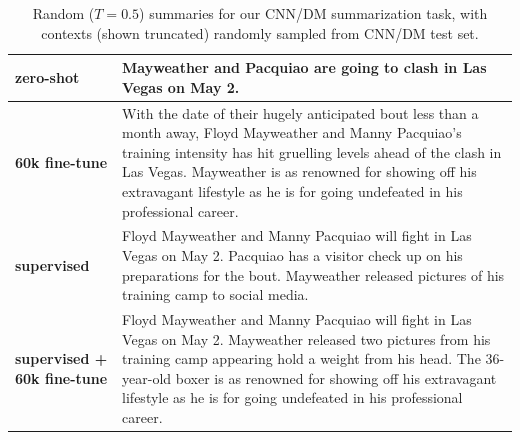 \begin{table}[t]
\begin{center}
\begin{tabular}{|p{2cm}|p{12cm}|}
\textbf{zero-shot}
&
Mayweather and Pacquiao are going to clash in Las Vegas on May 2.
\\
\hline
\textbf{60k fine-tune}
&
With the date of their hugely anticipated bout less than a month away, Floyd Mayweather and Manny Pacquiao's training intensity has hit gruelling levels ahead of the clash in Las Vegas.
\newline\newline
Mayweather is as renowned for showing off his extravagant lifestyle as he is for going undefeated in his professional career.
\\
\hline
\textbf{supervised}
&
Floyd Mayweather and Manny Pacquiao will fight in Las Vegas on May 2. Pacquiao has a visitor check up on his preparations for the bout. Mayweather released pictures of his training camp to social media.
\\
\hline
\textbf{supervised + 60k fine-tune}
&
Floyd Mayweather and Manny Pacquiao will fight in Las Vegas on May 2. Mayweather released two pictures from his training camp appearing hold a weight from his head. The 36-year-old boxer is as renowned for showing off his extravagant lifestyle as he is for going undefeated in his professional career.
\\
\hline


\end{tabular}
\caption{Random ($T=0.5$) summaries for our CNN/DM summarization task, with contexts (shown truncated) randomly sampled from CNN/DM test set.}
\label{tab:samples-summarization-cnndm2}
\end{center}
\end{table}
    

